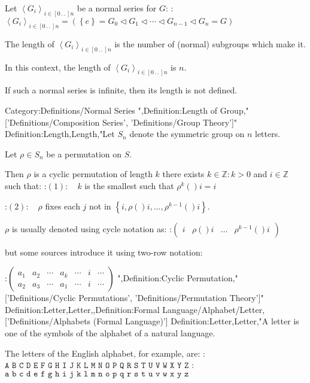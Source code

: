 Let $\left\langle G_i \right\rangle_{i \mathop \in \left[ 0 \,.\,.\,   \right]n}$ be a normal series for $G$:
:$\left\langle G_i \right\rangle_{i \mathop \in \left[ 0 \,.\,.\,   \right]n} = \left( \left\lbrace e \right\rbrace = G_0 \lhd G_1 \lhd \cdots \lhd G_{n-1} \lhd G_n = G \right)$


The length of $\left\langle G_i \right\rangle_{i \mathop \in \left[ 0 \,.\,.\,   \right]n}$ is the number of (normal) subgroups which make it.

In this context, the length of $\left\langle G_i \right\rangle_{i \mathop \in \left[ 0 \,.\,.\,   \right]n}$ is $n$.


If such a normal series is infinite, then its length is not defined.


Category:Definitions/Normal Series
",Definition:Length of Group,"['Definitions/Composition Series', 'Definitions/Group Theory']"
Definition:Length,Length,"Let $S_n$ denote the symmetric group on $n$ letters.

Let $\rho \in S_n$ be a permutation on $S$.


Then $\rho$ is a cyclic permutation of length $k$  there exists $k \in \mathbb Z: k > 0$ and $i \in \mathbb Z$ such that:
:$(1): \quad k$ is the smallest such that $\rho^k \left(   \right)i = i$

:$(2): \quad \rho$ fixes each $j$ not in $\left\lbrace i, \rho \left(   \right)i, \ldots, \rho^{k - 1}  \left(   \right)i \right\rbrace$.


$\rho$ is usually denoted using cycle notation as:
:$\begin{pmatrix} i & \rho \left(   \right)i & \ldots & \rho^{k - 1}  \left(   \right)i \end{pmatrix}$

but some sources introduce it using two-row notation:

:$\begin{pmatrix} a_1 & a_2 & \cdots & a_k & \cdots & i & \cdots \\ a_2 & a_3 & \cdots & a_1 & \cdots & i & \cdots \end{pmatrix}$
",Definition:Cyclic Permutation,"['Definitions/Cyclic Permutations', 'Definitions/Permutation Theory']"
Definition:Letter,Letter,,Definition:Formal Language/Alphabet/Letter,['Definitions/Alphabets (Formal Language)']
Definition:Letter,Letter,"A letter is one of the symbols of the alphabet of a natural language.

The letters of the English alphabet, for example, are:
:$\texttt {A B C D E F G H I J K L M N O P Q R S T U V W X Y Z}$
:$\texttt {a b c d e f g h i j k l m n o p q r s t u v w x y z}$


